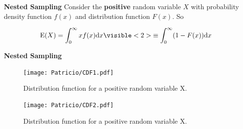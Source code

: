 \begin{frame}{\small{\textbf{Nested Sampling}}}
Consider the \textbf<1,2>{positive} random variable $X$ with probability density function $f(x)$ and distribution function $F(x)$. So

\begin{align*}
\text{E}(X) = \int_{0}^{\infty} x f(x) \text{d}x \visible<2>{ \equiv \int_{0}^{\infty} (1- F(x))\text{d}x	}
\end{align*}

\end{frame}
\begin{frame}{\small{\textbf{Nested Sampling}}}
\begin{overprint}
\begin{figure}[]    		
		\texttt{[image: Patricio/CDF1.pdf]}
		\caption{Distribution function for a positive random variable X.}
\end{figure}
\begin{figure}[]    		
		\texttt{[image: Patricio/CDF2.pdf]}
		\caption{Distribution function for a positive random variable X.}
\end{figure}
\end{overprint}
\end{frame}
